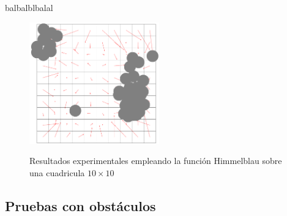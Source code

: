 \documentclass[runningheads]{llncs}
\newcommand{\comment}[1]{}
\begin{document}
balbalblbalal

    \begin{figure}[htbp]
   	\centering
   	\includegraphics[width=0.5\textwidth]{Resultados_himmelblau_10x10}
   	\label{fig:5}
   	\caption{Resultados experimentales empleando la función Himmelblau sobre una cuadricula $10\times10$}
   \end{figure}

\comment{
    \subsubsection{Función Lineal}
    $f(x,y)=-(x-g_x)^2 - (y - g_y)^2 + 700$; con máximo en $(g_x,g_y)$
}
    \subsection{Pruebas con obstáculos}
\end{document}
